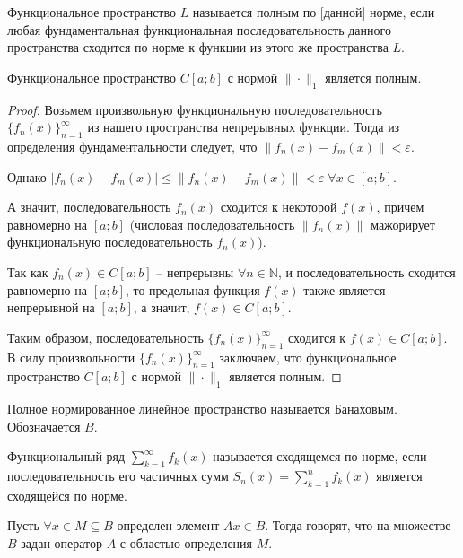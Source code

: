 \begin{definition}
	Функциональное пространство $L$ называется полным по [данной] норме, если любая фундаментальная функциональная последовательность данного пространства сходится по норме к функции из этого же пространства $L$.
\end{definition}

\begin{theorem}
	Функциональное пространство $C[a; b]$ с нормой $\| \cdot \|_1$ является полным.
\end{theorem}
\begin{proof}
	Возьмем произвольную функциональную последовательность $\{f_n(x)\}_{n = 1}^{\infty}$ из нашего пространства непрерывных функции. Тогда из определения фундаментальности следует, что $\|f_n(x) - f_m(x)\| < \varepsilon$.
	
	Однако $|f_n(x) - f_m(x)| \leqslant \|f_n(x) - f_m(x)\| < \varepsilon \; \forall x \in [a; b]$.
	
	А значит, последовательность $f_n(x)$ сходится к некоторой $f(x)$, причем равномерно на $[a; b]$ (числовая последовательность $\|f_n(x)\|$ мажорирует функциональную последовательность $f_n(x)$).
	
	Так как $f_n(x) \in C[a; b]$ -- непрерывны $\forall n \in \mathbb{N}$, и последовательность сходится равномерно на $[a; b]$, то предельная функция $f(x)$ также является непрерывной на $[a; b]$, а значит, $f(x) \in C[a; b]$. 
	
	Таким образом, последовательность $\{f_n(x)\}_{n = 1}^{\infty}$ сходится к $f(x) \in C[a; b]$. В силу произвольности $\{f_n(x)\}_{n = 1}^{\infty}$ заключаем, что функциональное пространство $C[a; b]$ с нормой $\| \cdot \|_1$ является полным.
\end{proof}

\begin{definition}
	Полное нормированное линейное пространство называется Банаховым. Обозначается $B$.
\end{definition}

\begin{definition}
	Функциональный ряд $\sum\limits_{k = 1}^{\infty} f_k(x)$ называется сходящемся по норме, если последовательность его частичных сумм $S_n(x) = \sum\limits_{k = 1}^{n} f_k(x)$ является сходящейся по норме.
\end{definition}

\begin{definition}
	Пусть $\forall x \in M \subseteq B$ определен элемент $Ax \in B$. Тогда говорят, что на множестве $B$ задан оператор $A$ с областью определения $M$.
\end{definition}

